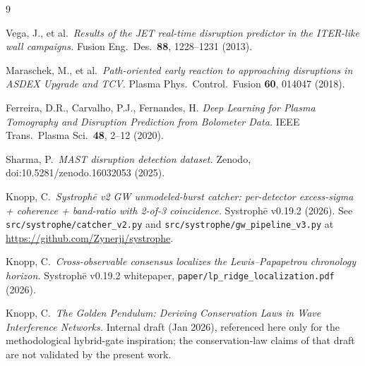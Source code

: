 \documentclass[11pt,letterpaper]{article}
\begin{document}
\begin{thebibliography}{9}

 Vega, J., et al.\ \emph{Results of the JET real-time disruption
predictor in the ITER-like wall campaigns.} Fusion Eng.\ Des.\ \textbf{88},
1228--1231 (2013).

 Maraschek, M., et al.\ \emph{Path-oriented early
reaction to approaching disruptions in ASDEX Upgrade and TCV.} Plasma
Phys.\ Control.\ Fusion \textbf{60}, 014047 (2018).

 Ferreira, D.R., Carvalho, P.J., Fernandes, H.
\emph{Deep Learning for Plasma Tomography and Disruption Prediction
from Bolometer Data.} IEEE Trans.\ Plasma Sci.\ \textbf{48}, 2--12 (2020).

 Sharma, P.\ \emph{MAST disruption detection
dataset.} Zenodo, doi:10.5281/zenodo.16032053 (2025).

 Knopp, C.\ \emph{Systroph\=e v2 GW unmodeled-burst
catcher: per-detector excess-sigma + coherence + band-ratio with
2-of-3 coincidence.} Systroph\=e v0.19.2 (2026). See \texttt{src/systrophe/catcher\_v2.py}
and \texttt{src/systrophe/gw\_pipeline\_v3.py} at
\url{https://github.com/Zynerji/systrophe}.

 Knopp, C.\ \emph{Cross-observable consensus
localizes the Lewis--Papapetrou chronology horizon.} Systroph\=e v0.19.2
whitepaper, \texttt{paper/lp\_ridge\_localization.pdf} (2026).

 Knopp, C.\ \emph{The Golden Pendulum:
Deriving Conservation Laws in Wave Interference Networks.} Internal
draft (Jan 2026), referenced here only for the methodological hybrid-gate
inspiration; the conservation-law claims of that draft are not
validated by the present work.

\end{thebibliography}
\end{document}
